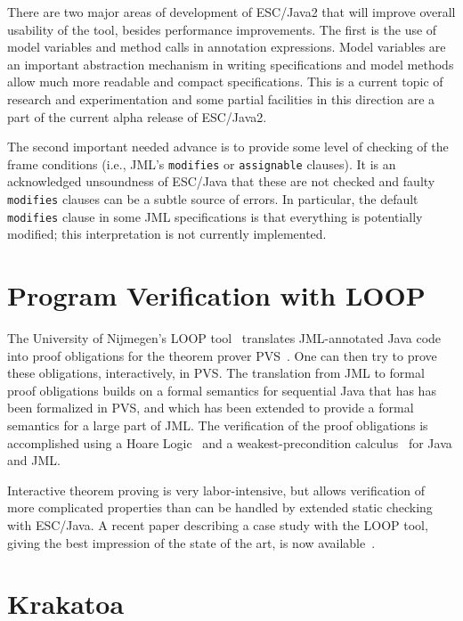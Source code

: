 There are two major areas of development of ESC/\-Java2 that will
improve overall usability of the tool, besides performance
improvements.  The first is the use of model variables and method
calls in annotation expressions.  Model variables are an important
abstraction mechanism in writing specifications and model methods
allow much more readable and compact specifications.  This is a
current topic of research and experimentation and some partial
facilities in this direction are a part of the current alpha release
of ESC/Java2.

The second important needed advance is to provide some level of
checking of the frame conditions (i.e., JML's \texttt{modifies} or
\texttt{assignable} clauses).  It is an acknowledged unsoundness of
ESC/Java that these are not checked and faulty \texttt{modifies}
clauses can be a subtle source of errors.  In particular, the default
\texttt{modifies} clause in some JML specifications is that everything
is potentially modified; this interpretation is not currently
implemented.

\section{Program Verification with LOOP}
\label{loop}

The University of Nijmegen's LOOP tool~\cite{Jacobs-etal98,Huisman01}
translates JML-annotated Java code into proof obligations for the
theorem prover PVS~\cite{OwreRRSS96}.  One can then try to prove these
obligations, interactively, in PVS\@.  The translation from JML to
formal proof obligations builds on a formal semantics for sequential
Java that has has been formalized in PVS, and which has been extended
to provide a formal semantics for a large part of JML\@.  The
verification of the proof obligations is accomplished using a Hoare
Logic~\cite{JacobsPoll01a} and a weakest-precondition
calculus~\cite{Jacobs03} for Java and JML\@.

Interactive theorem proving is very labor-intensive, but allows
verification of more complicated properties than can be handled by
extended static checking with ESC/Java.  A recent paper describing a
case study with the LOOP tool, giving the best impression of the state
of the art, is now available~\cite{BreunesseBJ02}.

 \section{Krakatoa}
 \label{krakatoa}
 
